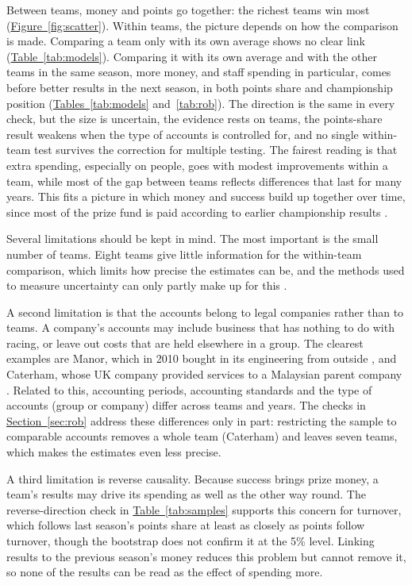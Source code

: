 \documentclass[11pt,a4paper]{article}
\begin{document}
Between teams, money and points go together: the richest teams win most
(\hyperref[fig:scatter]{Figure~\ref*{fig:scatter}}). Within teams, the picture depends on how the comparison is made.
Comparing a team only with its own average shows no clear link (\hyperref[tab:models]{Table~\ref*{tab:models}}). Comparing
it with its own average and with the other teams in the same season, more money, and staff spending in particular, comes
before better results in the next season, in both points share and championship position
(\hyperref[tab:models]{Tables~\ref*{tab:models}} and~\hyperref[tab:rob]{\ref*{tab:rob}}). The direction is the same in every
check, but the size is uncertain, the evidence rests on \NTeams{} teams, the points-share result weakens when the type of
accounts is controlled for, and no single within-team test survives the correction for multiple testing. The fairest
reading is that extra spending, especially on people, goes with modest improvements within a team, while most of the gap
between teams reflects differences that last for many years. This fits a picture in which money and success build up
together over time, since most of the prize fund is paid according to earlier championship results \citep{liberty2018}.

Several limitations should be kept in mind. The most important is the small number of teams.
Eight teams give little information for the within-team comparison, which limits how precise the estimates can be, and the
methods used to measure uncertainty can only partly make up for this \citep{cameron2015}.

A second limitation is that the accounts belong to legal companies rather than to teams. A company's accounts may include
business that has nothing to do with racing, or leave out costs that are held elsewhere in a group. The clearest examples
are Manor, which in 2010 bought in its engineering from outside \citep{ch_manor}, and Caterham, whose UK company provided
services to a Malaysian parent company \citep{ch_caterham}. Related to this, accounting periods, accounting standards and
the type of accounts (group or company) differ across teams and years. The checks in
\hyperref[sec:rob]{Section~\ref*{sec:rob}} address these differences only in part: restricting the sample to comparable
accounts removes a whole team (Caterham) and leaves seven teams, which makes the estimates even less precise.

A third limitation is reverse causality. Because success brings prize money, a team's results may drive its spending as
well as the other way round. The reverse-direction check in \hyperref[tab:samples]{Table~\ref*{tab:samples}} supports
this concern for turnover, which follows last season's points share at least as closely as points follow turnover, though
the bootstrap does not confirm it at the 5\% level. Linking results to the previous season's money reduces this problem
but cannot remove it, so none of the results can be read as the effect of spending more.
\end{document}
